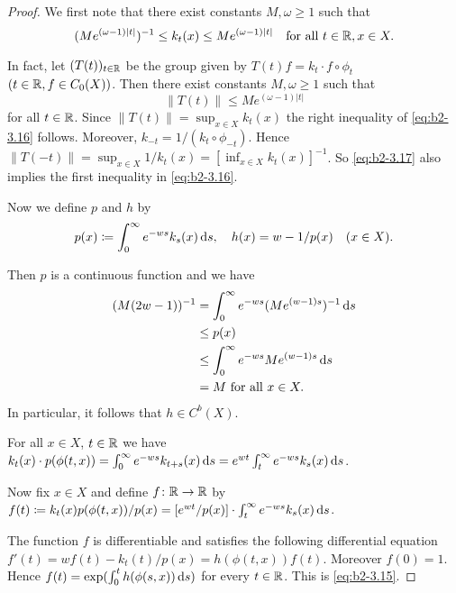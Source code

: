 \begin{proof}
We first note that there exist constants $M, \omega \geq 1$ such that
\begin{equation}\label{eq:b2-3.16}
(Me^{(\omega-1)|t|})^{-1} \leq k_{t}(x) \leq Me^{(\omega-1)|t|} \quad \text{for all } t \in \mathbb{R}, x \in X.
\end{equation}

In fact, let $(T(t))_{t \in \mathbb{R}}$ be the group given by $T(t)f = k_{t} \cdot f \circ \phi_{t}$ $(t \in \mathbb{R}, f \in C_{0}(X))$.
Then there exist constants $M, \omega \geq 1$ such that
\begin{equation}\label{eq:b2-3.17}
\|T(t)\| \leq Me^{(\omega-1)|t|}
\end{equation}
for all $t \in \mathbb{R}$.
Since $\|T(t)\| = \sup_{x \in X} k_{t}(x)$ the right inequality of
\eqref{eq:b2-3.16} follows.
Moreover, $k_{-t} = 1/(k_{t} \circ \phi_{-t})$.
Hence $\|T(-t)\| = \sup_{x \in X} 1/k_{t}(x) = [\inf_{x \in X} k_{t}(x)]^{-1}$.
So \eqref{eq:b2-3.17} also implies the first inequality in \eqref{eq:b2-3.16}.

Now we define $p$ and $h$ by
\[
p(x) \coloneqq \int_{0}^{\infty} e^{-ws}k_{s}(x) \mathop{}\!\mathrm{d}{s}, \quad
h(x) = w - 1/p(x) \quad (x \in X).
\]

Then $p$ is a continuous function and we have 
\begin{align*}
(M(2w - 1))^{-1} &= \int_{0}^{\infty} e^{-ws}(Me^{(w-1)s})^{-1} \mathop{}\!\mathrm{d}{s} \\ 
&\leq p(x) \\ 
&\leq \int_{0}^{\infty} e^{-ws}Me^{(w-1)s} \mathop{}\!\mathrm{d}{s} \\
&= M \text{ for all } x \in X.
\end{align*}
In particular, it follows that $h \in C^{b}(X)$.

For all $x \in X$, $t \in \mathbb{R}$ we have $k_{t}(x) \cdot p(\phi(t,x)) = \int_{0}^{\infty} e^{-ws}k_{t+s}(x) \mathop{}\!\mathrm{d}{s} = e^{wt} \int_{t}^{\infty} e^{-ws}k_{s}(x) \mathop{}\!\mathrm{d}{s}$.

Now fix $x \in X$ and define $f \colon \mathbb{R} \to \mathbb{R}$ by $f(t) \coloneqq k_{t}(x)p(\phi(t,x))/p(x) = [e^{wt}/p(x)] \cdot \int_{t}^{\infty} e^{-ws}k_{s}(x)  \mathop{}\!\mathrm{d}{s}$.

The function $f$ is differentiable and satisfies the following differential equation $f'(t) = wf(t)  - k_{t}(t)/p(x)  = h(\phi(t,x))f(t)$.
Moreover $f(0) = 1$.
Hence $f(t) = \exp(\int_{0}^{t} h(\phi(s,x)) \mathop{}\!\mathrm{d}{s})$ for every $t \in \mathbb{R}$.
This is \eqref{eq:b2-3.15}.
\end{proof}

